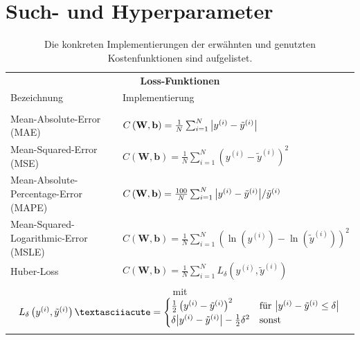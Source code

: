 \section{Such- und Hyperparameter}
\begin{table}[hb!]
	\centering
	\caption{Die konkreten Implementierungen der erwähnten und genutzten Kostenfunktionen sind aufgelistet.}
	\begin{tabular}{ll}
		\multicolumn{2}{c}{\textbf{Loss-Funktionen}}\\[10pt]
		Bezeichnung & Implementierung \\
		\hline\\[-10pt]
		Mean-Absolute-Error (MAE) &$C\left(\mathbf{W}, \mathbf{b}\right) = \frac{1}{N} \sum_{i=1}^{N} \abs{y^{(i)} - \tilde{y}^{(i)}}$\\[10pt]
		Mean-Squared-Error (MSE) & $C\left(\mathbf{W}, \mathbf{b}\right) = \frac{1}{N} \sum_{i=1}^{N} \left(y^{(i)} - \tilde{y}^{(i)}\right)^2$\\[10pt]
		Mean-Absolute-Percentage-Error (MAPE) & $C\left(\mathbf{W}, \mathbf{b}\right) = \frac{100}{N} \sum_{i=1}^{N} {\abs{y^{(i)} - \tilde{y}^{(i)}}  }/{\tilde{y}^{(i)}}$\\[10pt]
		Mean-Squared-Logarithmic-Error (MSLE) &$C\left(\mathbf{W}, \mathbf{b}\right) = \frac{1}{N} \sum_{i=1}^{N} \left(\ln(y^{(i)}) - \ln(\tilde{y}^{(i)})\right)^2$ \\[10pt]
		Huber-Loss & $C\left(\mathbf{W}, \mathbf{b}\right) = \frac{1}{N} \sum_{i=1}^{N} L_{\delta}\left(y^{(i)}, \tilde{y}^{(i)}\right)$\\[10pt]
		\multicolumn{2}{c}{\hspace{1cm} mit \hspace{1cm} $L_{\delta}\left(y^{(i)}, \tilde{y}^{(i)}\right)´=\begin{cases}
			\frac{1}{2}\left(y^{(i)} -  \tilde{y}^{(i)}\right)^2 \quad &\text{für}~\abs{y^{(i)} -  \tilde{y}^{(i)} \leq \delta} \\
			\delta \abs{y^{(i)} -  \tilde{y}^{(i)}} - \frac{1}{2}\delta^2 &\text{sonst}
			\end{cases}$} \\
		\\[-10pt]
		\hline
	\end{tabular}
	\label{Loss-Funktionen-Tabelle}
\end{table}
